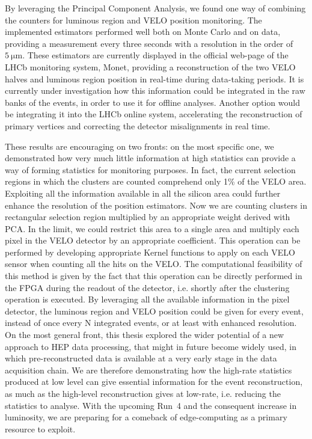 By leveraging the Principal Component Analysis, we found one way of combining the counters for luminous region and VELO position monitoring. The implemented estimators performed well both on Monte Carlo and on data, providing a measurement every three seconds with a resolution in the order of $\SI{5}{\micro\meter}$. These estimators are currently displayed in the official web-page of the LHCb monitoring system, Monet, providing a reconstruction of the two VELO halves and luminous region position in real-time during data-taking periods. It is currently under investigation how this information could be integrated in the raw banks of the events, in order to use it for offline analyses. Another option would be integrating it into the LHCb online system, accelerating the reconstruction of primary vertices and correcting the detector misalignments in real time.

These results are encouraging on two fronts: on the most specific one, we demonstrated how very much little information at high statistics can provide a way of forming statistics for monitoring purposes. In fact, the current selection regions in which the clusters are counted comprehend only 1\% of the VELO area. Exploiting all the information available in all the silicon area could further enhance the resolution of the position estimators. Now we are counting clusters in rectangular selection region multiplied by an appropriate weight derived with PCA. In the limit, we could restrict this area to a single area and multiply each pixel in the VELO detector by an appropriate coefficient. This operation can be performed by developing appropriate Kernel functions to apply on each VELO sensor when counting all the hits on the VELO. The computational feasibility of this method is given by the fact that this operation can be directly performed in the FPGA during the readout of the detector, i.e. shortly after the clustering operation is executed. By leveraging all the available information in the pixel detector, the luminous region and VELO position could be given for every event, instead of once every N integrated events, or at least with enhanced resolution.
On the most general front, this thesis explored the wider potential of a new approach to HEP data processing, that might in future become widely used, in which pre-reconstructed data is available at a very early stage in the data acquisition chain. We are therefore demonstrating how the high-rate statistics produced at low level can give essential information for the event reconstruction, as much as the high-level reconstruction gives at low-rate, i.e. reducing the statistics to analyse.
With the upcoming Run~4 and the consequent increase in luminosity, we are preparing for a comeback of edge-computing as a primary resource to exploit.